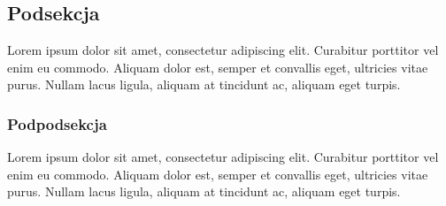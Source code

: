 \documentclass[10pt,a4paper]{article}
\begin{document}
\subsection{Podsekcja}
Lorem ipsum dolor sit amet, consectetur adipiscing elit. Curabitur porttitor vel enim eu commodo. Aliquam dolor est, semper et convallis eget, ultricies vitae purus. Nullam lacus ligula, aliquam at tincidunt ac, aliquam eget turpis.
\subsubsection{Podpodsekcja}
Lorem ipsum dolor sit amet, consectetur adipiscing elit. Curabitur porttitor vel enim eu commodo. Aliquam dolor est, semper et convallis eget, ultricies vitae purus. Nullam lacus ligula, aliquam at tincidunt ac, aliquam eget turpis.
\end{document}
